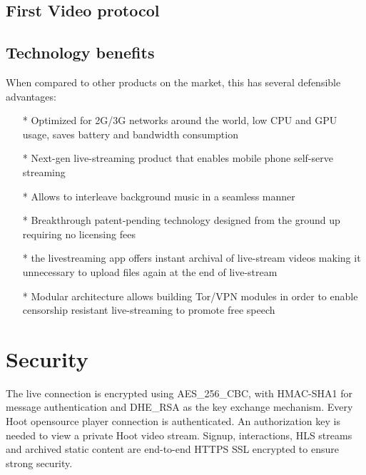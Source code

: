 \documentclass{article}
\begin{document}


\subsection{First Video protocol}


\subsection{Technology benefits}
When compared to other products on the market, this has several defensible advantages:
\begin{itemize}
\item[*]Optimized for 2G/3G networks around the world, low CPU and GPU usage, saves battery and bandwidth consumption
\item[*]Next-gen live-streaming product that enables mobile phone self-serve streaming 
\item[*]Allows to interleave background music in a seamless manner
\item[*]Breakthrough patent-pending technology designed from the ground up requiring no licensing fees
\item[*]the livestreaming app offers instant archival of live-stream videos making it unnecessary to upload files again at the end of live-stream
\item[*]Modular architecture allows building Tor/VPN modules in order to enable censorship resistant live-streaming to promote free speech
\end{itemize}



\section{Security}
The live connection is encrypted using AES\_256\_CBC, with HMAC-SHA1 for message authentication and DHE\_RSA as the key exchange mechanism. Every Hoot opensource player connection is authenticated.
An authorization key is needed to view a private Hoot video stream. Signup, interactions, HLS streams and archived static content are end-to-end HTTPS SSL encrypted to ensure strong security. 
\end{document}
